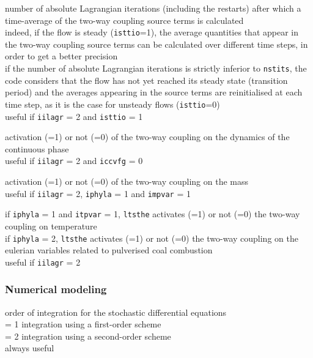 {number of absolute Lagrangian iterations (including the restarts)
after which a time-average of the two-way coupling source terms is
calculated\\
indeed, if the flow is steady (\texttt{isttio}=1), the average quantities
that appear in the two-way coupling source terms can be calculated over
different time steps, in order to get a better precision\\
if the number of absolute Lagrangian iterations is strictly inferior to
\texttt{nstits}, the code considers that the flow has not yet reached its
steady state (transition period) and the averages appearing in the source
terms are reinitialised at each time step, as it is the case for unsteady
flows (\texttt{isttio}=0)\\
useful if \texttt{iilagr} = 2 and \texttt{isttio} = 1}

{activation (=1) or not (=0) of the two-way coupling on the dynamics of the
continuous phase\\
useful if \texttt{iilagr} = 2 and \texttt{iccvfg} = 0}

{activation (=1) or not (=0) of the two-way coupling on the mass\\
useful if \texttt{iilagr} = 2, \texttt{iphyla} = 1 and \texttt{impvar} = 1}

{if \texttt{iphyla} = 1 and \texttt{itpvar} = 1, \texttt{ltsthe}
 activates (=1) or not (=0) the two-way coupling on temperature\\
if \texttt{iphyla} = 2, \texttt{ltsthe} activates (=1) or not (=0) the
two-way coupling on the eulerian variables related to pulverised coal
combustion\\
useful if \texttt{iilagr} = 2}

\subsubsection{Numerical modeling}

{order of integration for the stochastic differential equations\\
\hspace*{1.3cm} = 1 integration using a first-order scheme\\
\hspace*{1.3cm} = 2 integration using a second-order scheme\\
always useful}

